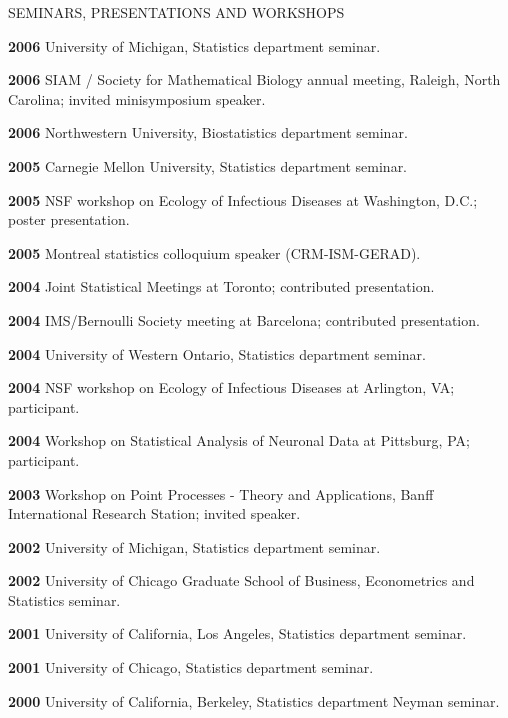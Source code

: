 \begin{mylist}{SEMINARS, PRESENTATIONS AND WORKSHOPS}
\item{\bf 2006 }  University of Michigan,
  Statistics department seminar. 
\item{\bf 2006 }  SIAM / Society for Mathematical Biology annual meeting, Raleigh, North Carolina; invited minisymposium speaker.
\item{\bf 2006 }  Northwestern University, 
 Biostatistics department seminar.
\item{\bf 2005 }  Carnegie Mellon University, 
 Statistics department seminar.
\item{\bf 2005 }  NSF workshop on Ecology of
  Infectious Diseases at Washington, D.C.; poster presentation.
\item{\bf 2005 } Montreal statistics
  colloquium speaker (CRM-ISM-GERAD).
\item{\bf 2004 } Joint Statistical Meetings at
  Toronto; contributed presentation.
\item{\bf 2004 } IMS/Bernoulli Society meeting at Barcelona; contributed presentation.
\item{\bf 2004 } University of Western Ontario, 
 Statistics department seminar.
\item{\bf 2004 } NSF workshop on Ecology of
  Infectious Diseases at Arlington, VA; participant.
\item{\bf 2004 } Workshop on Statistical Analysis of
  Neuronal Data at Pittsburg, PA; participant.
\item{\bf 2003 }  Workshop on Point Processes - Theory and Applications,
  Banff International Research Station; invited speaker.
\item{\bf 2002 }  University of Michigan,
  Statistics department seminar. 
\item{\bf 2002 }  University of Chicago Graduate School of Business, Econometrics and Statistics seminar. 
\item{\bf 2001 } University of California, Los Angeles, Statistics department seminar. 
\item{\bf 2001 }  University of Chicago, Statistics department seminar.  
\item{\bf 2000 } University of California, Berkeley, Statistics department Neyman seminar.
\end{mylist}















